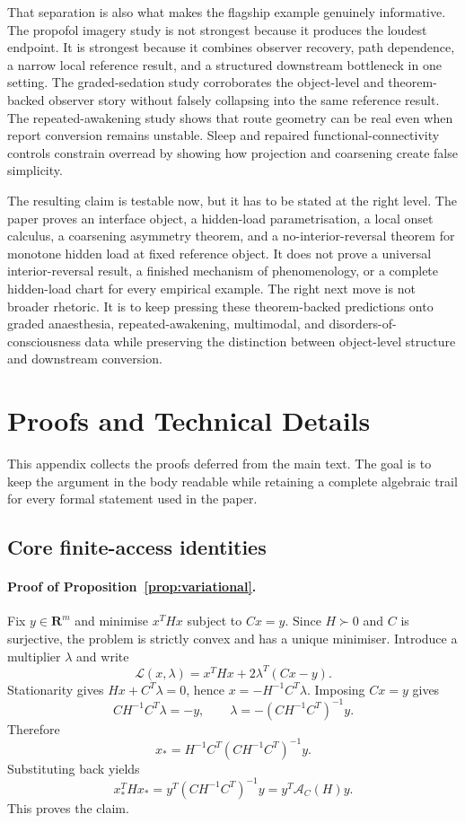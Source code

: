 \documentclass[11pt,a4paper]{article}
\numberwithin{equation}{section}
\newcommand{\R}{\mathbf R}
\newcommand{\Aobs}{\mathcal A}
\theoremstyle{thmcompact}
\theoremstyle{remark}
\begin{document}
That separation is also what makes the flagship example genuinely informative. The propofol imagery study is not strongest because it produces the loudest endpoint. It is strongest because it combines observer recovery, path dependence, a narrow local reference result, and a structured downstream bottleneck in one setting. The graded-sedation study corroborates the object-level and theorem-backed observer story without falsely collapsing into the same reference result. The repeated-awakening study shows that route geometry can be real even when report conversion remains unstable. Sleep and repaired functional-connectivity controls constrain overread by showing how projection and coarsening create false simplicity.

The resulting claim is testable now, but it has to be stated at the right level. The paper proves an interface object, a hidden-load parametrisation, a local onset calculus, a coarsening asymmetry theorem, and a no-interior-reversal theorem for monotone hidden load at fixed reference object. It does not prove a universal interior-reversal result, a finished mechanism of phenomenology, or a complete hidden-load chart for every empirical example. The right next move is not broader rhetoric. It is to keep pressing these theorem-backed predictions onto graded anaesthesia, repeated-awakening, multimodal, and disorders-of-consciousness data while preserving the distinction between object-level structure and downstream conversion.

\appendix

\section{Proofs and Technical Details}
\label{app:proofs}

This appendix collects the proofs deferred from the main text. The goal is to keep the argument in the body readable while retaining a complete algebraic trail for every formal statement used in the paper.

\subsection{Core finite-access identities}

\paragraph{Proof of Proposition~\ref{prop:variational}.}
Fix \(y\in\R^m\) and minimise \(x^THx\) subject to \(Cx=y\). Since \(H\succ0\) and \(C\) is surjective, the problem is strictly convex and has a unique minimiser. Introduce a multiplier \(\lambda\) and write
\[
\mathcal L(x,\lambda)=x^THx+2\lambda^T(Cx-y).
\]
Stationarity gives \(Hx+C^T\lambda=0\), hence \(x=-H^{-1}C^T\lambda\). Imposing \(Cx=y\) gives
\[
CH^{-1}C^T\lambda=-y,
\qquad
\lambda=-(CH^{-1}C^T)^{-1}y.
\]
Therefore
\[
x_*=H^{-1}C^T(CH^{-1}C^T)^{-1}y.
\]
Substituting back yields
\[
x_*^THx_*=y^T(CH^{-1}C^T)^{-1}y=y^T\Aobs_C(H)y.
\]
This proves the claim.
\end{document}
